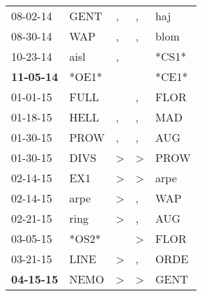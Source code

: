 \begin{supertabular}{p{0.07\textwidth}p{0.06\textwidth}p{0.02\textwidth}p{0.02\textwidth}p{0.06\textwidth}}
          08-02-14\textsuperscript{} &           GENT\textsuperscript{} &                , &                , &            haj\textsuperscript{} \\
          08-30-14\textsuperscript{} &            WAP\textsuperscript{} &                , &                , &           blom\textsuperscript{} \\
          10-23-14\textsuperscript{} &           aisl\textsuperscript{} &                , &                  &                            *CS1* \\
 \textbf{11-05-14\textsuperscript{}} &                            *OE1* &                  &                  &                            *CE1* \\
          01-01-15\textsuperscript{} &           FULL\textsuperscript{} &                  &                , &           FLOR\textsuperscript{} \\
          01-18-15\textsuperscript{} &           HELL\textsuperscript{} &                , &                , &            MAD\textsuperscript{} \\
          01-30-15\textsuperscript{} &           PROW\textsuperscript{} &                , &                , &            AUG\textsuperscript{} \\
          01-30-15\textsuperscript{} &           DIVS\textsuperscript{} &     \textgreater &     \textgreater &           PROW\textsuperscript{} \\
          02-14-15\textsuperscript{} &            EX1\textsuperscript{} &     \textgreater &     \textgreater &           arpe\textsuperscript{} \\
          02-14-15\textsuperscript{} &           arpe\textsuperscript{} &     \textgreater &                , &            WAP\textsuperscript{} \\
          02-21-15\textsuperscript{} &           ring\textsuperscript{} &     \textgreater &                , &            AUG\textsuperscript{} \\
          03-05-15\textsuperscript{} &                            *OS2* &                  &     \textgreater &           FLOR\textsuperscript{} \\
          03-21-15\textsuperscript{} &           LINE\textsuperscript{} &     \textgreater &                , &           ORDE\textsuperscript{} \\
 \textbf{04-15-15\textsuperscript{}} &           NEMO\textsuperscript{} &     \textgreater &     \textgreater &           GENT\textsuperscript{} \\

\end{supertabular}
